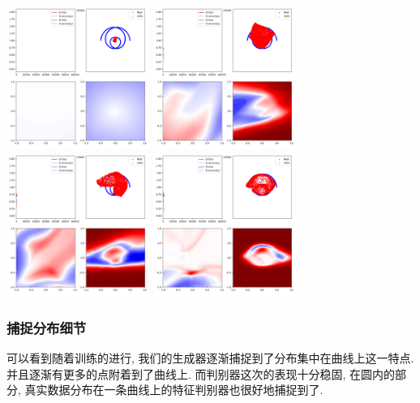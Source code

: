 \documentclass[lang=cn,11pt]{elegantpaper}
\begin{document}
\begin{center}
  \includegraphics[width=0.35\textwidth]{wings_2_1}
  \includegraphics[width=0.35\textwidth]{wings_2_2}\\
  \includegraphics[width=0.35\textwidth]{wings_2_3}
  \includegraphics[width=0.35\textwidth]{wings_2_4}
\end{center}

\subsubsection{捕捉分布细节}
可以看到随着训练的进行, 我们的生成器逐渐捕捉到了分布集中在曲线上这一特点. 并且逐渐有更多的点附着到了曲线上. 而判别器这次的表现十分稳固, 在圆内的部分, 真实数据分布在一条曲线上的特征判别器也很好地捕捉到了. 
\end{document}
